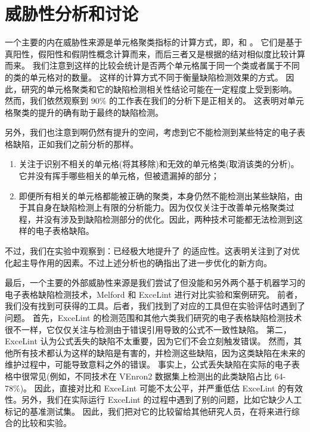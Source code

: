 \section{威胁性分析和讨论}

一个主要的内在威胁性来源是单元格聚类指标的计算方式，即\prc ，\rec 和 \fmc 。
它们是基于真阳性，假阳性和假阴性概念计算而来，而后三者又是根据\cu 的结对相似度比较计算而来。
我们注意到这样的比较会统计是否两个单元格属于同一个类或者属于不同的类的单元格对的数量。
这样的计算方式不同于衡量缺陷检测效果的方式。
因此，研究\wa 的单元格聚类和它的缺陷检测相关性结论可能在一定程度上受到影响。
然而，我们依然观察到 90\% 的工作表在我们的分析下是正相关的。
这表明\wa 对单元格聚类的提升的确有助于最终的缺陷检测。

另外，我们也注意到\wa 啊仍然有提升的空间，考虑到它不能检测到某些特定的电子表格缺陷，正如我们之前分析的那样。
\begin{enumerate}
    \item \wa 关注于识别不相关的单元格(将其移除)和无效的单元格类(取消该类的分析)。它并没有挥手哪些相关的单元格，但被\cu 遗漏掉的部分；
    \item 即便所有相关的单元格都能被正确的聚类，\cu 本身仍然不能检测出某些缺陷，由于其自身在缺陷检测上有限的分析能力。因为\wa 仅仅关注于改善单元格聚类过程，并没有涉及到缺陷检测部分的优化。因此，两种技术可能都无法检测到这样的电子表格缺陷。
\end{enumerate}
不过，我们在实验中观察到：\wa 已经极大地提升了 \cu 的适应性。这表明\wa 关注到了对优化起主导作用的因素。不过上述分析也的确指出了进一步优化的新方向。

最后，一个主要的外部威胁性来源是我们尝试了但没能和另外两个基于机器学习的电子表格缺陷检测技术，Melford\cite{singh2017melford} 和 ExceLint\cite{Barowy2018excelint} 进行对比实验和案例研究。
前者，我们没有找到可获得的工具。后者，我们找到了对应的工具但在实验评估时遇到了问题。
首先，ExceLint 的检测范围和其他六类我们研究的电子表格缺陷检测技术很不一样，它仅仅关注与检测由于错误引用导致的公式不一致性缺陷。
第二，ExceLint 认为公式丢失的缺陷不太重要，因为它们不会立刻触发错误。
然而，其他所有技术都认为这样的缺陷是有害的，并检测这些缺陷，因为这类缺陷在未来的维护过程中，可能导致意料之外的错误。
事实上，公式丢失缺陷在实际的电子表格中很常见(例如，不同技术在 VEnron2 数据集上检测出的此类缺陷占比 64-78\%)。
因此，直接对比\wa 和 ExceLint 可能不太公平，并严重低估 ExceLint 的有效性。另外，我们在实际运行 ExceLint 的过程中遇到了别的问题，比如它缺少人工标记的基准测试集。
因此，我们把对它的比较留给其他研究人员，在将来进行综合的比较和实验。